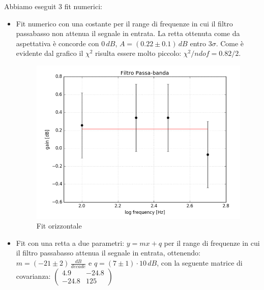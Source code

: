 \documentclass[10pt,a4paper]{article}
\begin{document}
Abbiamo eseguit 3 fit numerici:\\
\begin{itemize}
\item
Fit numerico con una costante per il range di frequenze in cui il filtro passabasso non attenua il segnale in entrata. 
La retta ottenuta come da aspettativa è concorde con $0\,dB$, $A = (0.22 \pm 0.1) \, dB$ entro $3\sigma$. Come è evidente dal grafico il $\chi^2$ risulta essere molto piccolo: $\chi^2/ndof = 0.82/2$.

\begin{figure}[h]
\centering
\includegraphics[scale=0.4]{immagine1.png}
\caption{Fit orizzontale}
\end{figure}

\item
Fit con una retta a due parametri: $y = mx + q$ per il range di frequenze in cui il filtro passabasso attenua il segnale in entrata, ottenendo: $m = (-21 \pm 2) \, \frac{dB}{decade}$ e $q = (7 \pm 1) \cdot 10 \, dB$, con la seguente matrice di covarianza:
$\left(\begin{array}{cc}
4.9 & -24.8 \\ 
-24.8 & 125
\end{array}\right)$


\end{itemize}
\end{document}

